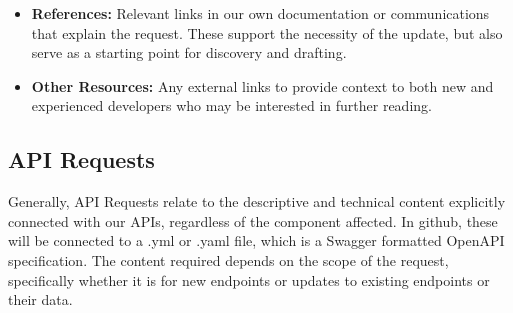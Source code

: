 \documentclass[a4paper]{article}
\begin{document}
\begin{itemize}
\begin{itemize}
		\item \textbf{New Doc}
		\begin{itemize}
			\item \textbf{Purpose:} What information should the new doc be written to communicate? Providing this information helps us identify the best team members to work through discovery and drafting while also allowing us to determine whether it should be descriptive or opinionated in approach.
			\item \textbf{Key points:} What are the major topics that need to be highlighted in the new doc? Without this information, the drafting stage will take much longer as we identify the best approach to covering the topic.
			\item \textbf{Related functions/features:} What parts of the platform are connected to the doc being requested? Knowing this helps us highlight processes and steps that may be involved in whatever the doc is communicating.
			\item \textbf{Use Cases:} If a doc is covering a major feature or a function of the platform, providing use cases for the content also serves to provide extended rationale for writing the doc.
			\item \textbf{Description:} A description of the doc to be written. If the above is provided in thorough detail, this may be excluded. Remember: more information is better.
		\end{itemize}
	\end{itemize}
	\item \textbf{References:} Relevant links in our own documentation or communications that explain the request. These support the necessity of the update, but also serve as a starting point for discovery and drafting.
	\item \textbf{Other Resources:} Any external links to provide context to both new and experienced developers who may be interested in further reading.
\end{itemize}

\subsection*{API Requests}
Generally, API Requests relate to the descriptive and technical content explicitly connected with our APIs, regardless of the component affected. In github, these will be connected to a {\ttfamily .yml} or {\ttfamily .yaml} file, which is a Swagger formatted OpenAPI specification. The content required depends on the scope of the request, specifically whether it is for new endpoints or updates to existing endpoints or their data.
\end{document}
